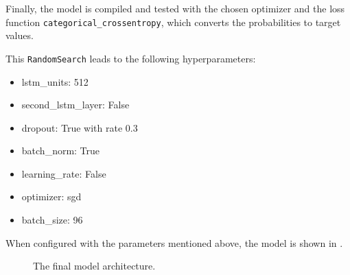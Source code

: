 Finally, the model is compiled and tested with the chosen optimizer and the loss function \texttt{categorical\_crossentropy}, which converts the probabilities to target values.

This \texttt{RandomSearch} leads to the following hyperparameters:
\begin{itemize}
    \item lstm\_units: 512
    \item second\_lstm\_layer: False
    \item dropout: True with rate 0.3
    \item batch\_norm: True
    \item learning\_rate: False
    \item optimizer: sgd
    \item batch\_size: 96
\end{itemize}

When configured with the parameters mentioned above, the model is shown in .
\begin{figure}[h!]
    \centering
    
    \caption{The final model architecture.}
    \label{final_model}
\end{figure}



